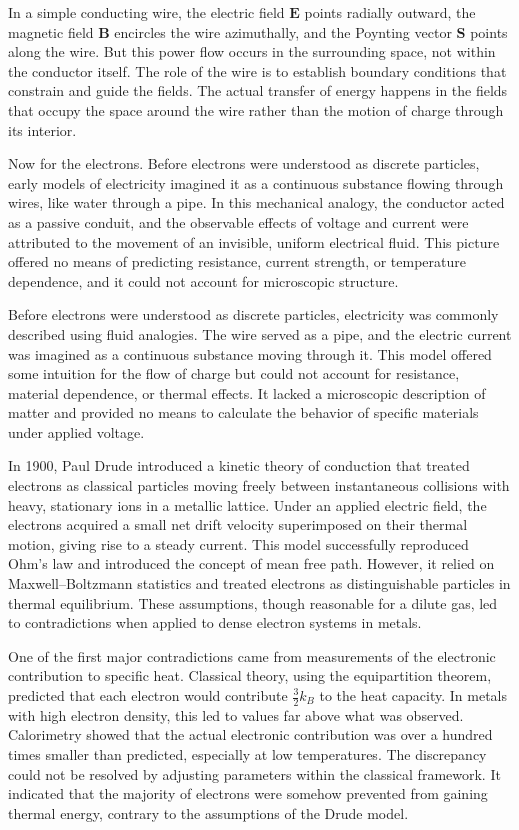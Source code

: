 In a simple conducting wire, the electric field $\mathbf{E}$ points radially outward, the magnetic field $\mathbf{B}$ encircles the wire azimuthally, and the Poynting vector $\mathbf{S}$ points along the wire. But this power flow occurs in the surrounding space, not within the conductor itself. The role of the wire is to establish boundary conditions that constrain and guide the fields. The actual transfer of energy happens in the fields that occupy the space around the wire rather than the motion of charge through its interior.

Now for the electrons. Before electrons were understood as discrete particles, early models of electricity imagined it as a continuous substance flowing through wires, like water through a pipe. In this mechanical analogy, the conductor acted as a passive conduit, and the observable effects of voltage and current were attributed to the movement of an invisible, uniform electrical fluid. This picture offered no means of predicting resistance, current strength, or temperature dependence, and it could not account for microscopic structure.

Before electrons were understood as discrete particles, electricity was commonly described using fluid analogies. The wire served as a pipe, and the electric current was imagined as a continuous substance moving through it. This model offered some intuition for the flow of charge but could not account for resistance, material dependence, or thermal effects. It lacked a microscopic description of matter and provided no means to calculate the behavior of specific materials under applied voltage.

In 1900, Paul Drude introduced a kinetic theory of conduction that treated electrons as classical particles moving freely between instantaneous collisions with heavy, stationary ions in a metallic lattice. Under an applied electric field, the electrons acquired a small net drift velocity superimposed on their thermal motion, giving rise to a steady current. This model successfully reproduced Ohm’s law and introduced the concept of mean free path. However, it relied on Maxwell–Boltzmann statistics and treated electrons as distinguishable particles in thermal equilibrium. These assumptions, though reasonable for a dilute gas, led to contradictions when applied to dense electron systems in metals.

One of the first major contradictions came from measurements of the electronic contribution to specific heat. Classical theory, using the equipartition theorem, predicted that each electron would contribute $\tfrac{3}{2}k_B$ to the heat capacity. In metals with high electron density, this led to values far above what was observed. Calorimetry showed that the actual electronic contribution was over a hundred times smaller than predicted, especially at low temperatures. The discrepancy could not be resolved by adjusting parameters within the classical framework. It indicated that the majority of electrons were somehow prevented from gaining thermal energy, contrary to the assumptions of the Drude model.

